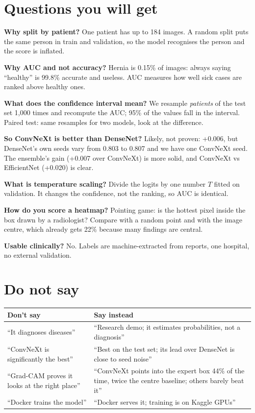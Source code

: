 \documentclass[11pt,a4paper]{article}
\begin{document}
\section*{Questions you will get}
\textbf{Why split by patient?} One patient has up to 184 images. A random split puts the same person in train and validation, so the model recognises the person and the score is inflated.

\textbf{Why AUC and not accuracy?} Hernia is 0.15\% of images: always saying ``healthy'' is 99.8\% accurate and useless. AUC measures how well sick cases are ranked above healthy ones.

\textbf{What does the confidence interval mean?} We resample \emph{patients} of the test set 1,000 times and recompute the AUC; 95\% of the values fall in the interval. Paired test: same resamples for two models, look at the difference.

\textbf{So ConvNeXt is better than DenseNet?} Likely, not proven: +0.006, but DenseNet's own seeds vary from 0.803 to 0.807 and we have one ConvNeXt seed. The ensemble's gain (+0.007 over ConvNeXt) is more solid, and ConvNeXt vs EfficientNet (+0.020) is clear.

\textbf{What is temperature scaling?} Divide the logits by one number $T$ fitted on validation. It changes the confidence, not the ranking, so AUC is identical.

\textbf{How do you score a heatmap?} Pointing game: is the hottest pixel inside the box drawn by a radiologist? Compare with a random point and with the image centre, which already gets 22\% because many findings are central.

\textbf{Usable clinically?} No. Labels are machine-extracted from reports, one hospital, no external validation.

\section*{Do not say}
\begin{tabular}{@{}p{}p{}@{}}
\toprule
Don't say & Say instead \\
\midrule
``It diagnoses diseases'' & ``Research demo; it estimates probabilities, not a diagnosis'' \\
``ConvNeXt is significantly the best'' & ``Best on the test set; its lead over DenseNet is close to seed noise'' \\
``Grad-CAM proves it looks at the right place'' & ``ConvNeXt points into the expert box 44\% of the time, twice the centre baseline; others barely beat it'' \\
``Docker trains the model'' & ``Docker serves it; training is on Kaggle GPUs'' \\
\bottomrule
\end{tabular}
\end{document}

